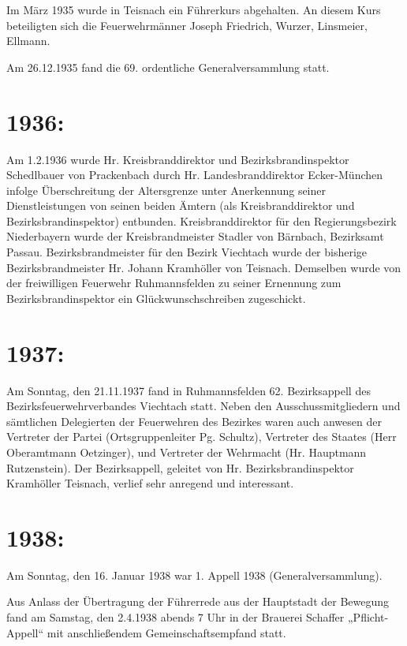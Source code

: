 \documentclass[12pt,a4paper]{book}
\begin{document}
Im März 1935 wurde in Teisnach ein Führerkurs abgehalten. An diesem Kurs
beteiligten sich die Feuerwehrmänner Joseph Friedrich, Wurzer, Linsmeier,
Ellmann.

Am 26.12.1935 fand die 69. ordentliche Generalversammlung statt.

\section{1936:}

Am 1.2.1936 wurde Hr. Kreisbranddirektor und Bezirksbrandinspektor Schedlbauer
von Prackenbach durch Hr. Landesbranddirektor Ecker-München infolge
Überschreitung der Altersgrenze unter Anerkennung seiner Dienstleistungen von
seinen beiden Ämtern (als Kreisbranddirektor und Bezirksbrandinspektor)
entbunden. Kreisbranddirektor für den Regierungsbezirk Niederbayern wurde der
Kreisbrandmeister Stadler von Bärnbach, Bezirksamt Passau. Bezirksbrandmeister
für den Bezirk Viechtach wurde der bisherige Bezirksbrandmeister Hr. Johann
Kramhöller von Teisnach. Demselben wurde von der freiwilligen Feuerwehr
Ruhmannsfelden zu seiner Ernennung zum Bezirksbrandinspektor ein
Glückwunschschreiben zugeschickt.

\section{1937:}

Am Sonntag, den 21.11.1937 fand in Ruhmannsfelden 62. Bezirksappell des
Bezirksfeuerwehrverbandes Viechtach statt. Neben den Ausschussmitgliedern und
sämtlichen Delegierten der Feuerwehren des Bezirkes waren auch anwesen der
Vertreter der Partei (Ortsgruppenleiter Pg. Schultz), Vertreter des Staates
(Herr Oberamtmann Oetzinger), und Vertreter der Wehrmacht (Hr. Hauptmann
Rutzenstein). Der Bezirksappell, geleitet von Hr. Bezirksbrandinspektor
Kramhöller Teisnach, verlief sehr anregend und interessant.

\section{1938:}

Am Sonntag, den 16. Januar 1938 war 1. Appell 1938 (Generalversammlung).

Aus Anlass der Übertragung der Führerrede aus der Hauptstadt der Bewegung fand
am Samstag, den 2.4.1938 abends 7 Uhr in der Brauerei Schaffer „Pflicht-Appell“
mit anschließendem Gemeinschaftsempfand statt.
\end{document}

